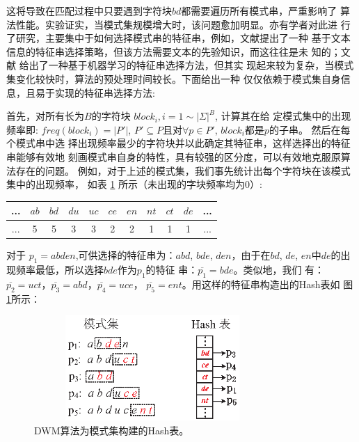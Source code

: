 这将导致在匹配过程中只要遇到字符块$bd$都需要遍历所有模式串，严重影响了
算法性能。实验证实，当模式集规模增大时，该问题愈加明显。亦有学者对此进
行了研究，主要集中于如何选择模式串的特征串，例如，文献\cite{}提出了一种
基于文本信息的特征串选择策略，但该方法需要文本的先验知识，而这往往是未
知的；文献\cite{Tan2011} 给出了一种基于机器学习的特征串选择方法，但其实
现起来较为复杂，当模式集变化较快时，算法的预处理时间较长。下面给出一种
仅仅依赖于模式集自身信息，且易于实现的特征串选择方法:

首先，对所有长为$B$的字符块 $block_i, i=1 \sim |\Sigma|^B$, 计算其在给
定模式集中的出现频率即: $freq(block_i)=|P'|$, $P' \subseteq
P$且对$\forall p \in P'$, $block_i$都是$p$的子串。 然后在每个模式串中选
择出现频率最少的字符块并以此确定其特征串，这样选择出的特征串能够有效地
刻画模式串自身的特性，具有较强的区分度，可以有效地克服原算法存在的问题。
例如，对于上述的模式集，我们事先统计出每个字符块在该模式集中的出现频率，
如表 \ref{tab:block_freq} 所示（未出现的字块频率均为0）:


\begin{table}[!htbp]
\centering
\vspace{-8pt}
\begin{tabular}{|c|c|c|c|c|c|c|c|c|c|c|} \hline
  ... & $ab$ & $bd$ & $du$ & $uc$ & $ce$ &  $en$ & $nt$ & $ct$ & $de$ & ... \\\hline
  ... & 5 & 5 & 3 & 3 & 2 & 2 & 1 & 1 & 1 & ... \\
  \hline
  \end{tabular}
  \label{tab:block_freq}
\end{table}


对于 $p_1=abden$,可供选择的特征串为：$abd$, $bde$, $den$，由于在$bd$,
$de$,
$en$中$de$的出现频率最低，所以选择$bde$作为$p_1$的特征
串：$\overline{p_1}=bde$。类似地，我们
有：$\overline{p_2}=uct$，$\overline{p_3}=abd$，$\overline{p_4}=uce$，
$\overline{p_5}=ent$。用这样的特征串构造出的Hash表如
图\ref{fig:WM_hash_table2}所示：

\begin{figure}[!h]
  \centering
  \includegraphics[height=4cm ,width=9cm]{figures/5_WM/WM_hash_table2.eps}
  \caption{DWM算法为模式集构建的Hash表。}
  \label{fig:WM_hash_table2}
\end{figure}


